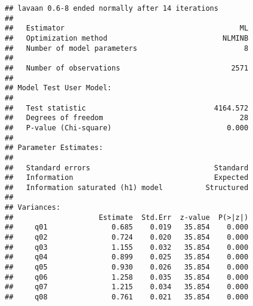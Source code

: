 \documentclass[
]{article}
\newenvironment{Shaded}{\begin{snugshade}}{\end{snugshade}}
\newcommand{\AttributeTok}[1]{\textcolor[rgb]{0.77,0.63,0.00}{#1}}
\newcommand{\CommentTok}[1]{\textcolor[rgb]{0.56,0.35,0.01}{\textit{#1}}}
\newcommand{\FunctionTok}[1]{\textcolor[rgb]{0.00,0.00,0.00}{#1}}
\newcommand{\NormalTok}[1]{#1}
\newcommand{\OtherTok}[1]{\textcolor[rgb]{0.56,0.35,0.01}{#1}}
\newcommand{\SpecialCharTok}[1]{\textcolor[rgb]{0.00,0.00,0.00}{#1}}
\newcommand{\StringTok}[1]{\textcolor[rgb]{0.31,0.60,0.02}{#1}}
\begin{document}
\begin{Shaded}
\end{Shaded}

\begin{verbatim}
## lavaan 0.6-8 ended normally after 14 iterations
## 
##   Estimator                                         ML
##   Optimization method                           NLMINB
##   Number of model parameters                         8
##                                                       
##   Number of observations                          2571
##                                                       
## Model Test User Model:
##                                                       
##   Test statistic                              4164.572
##   Degrees of freedom                                28
##   P-value (Chi-square)                           0.000
## 
## Parameter Estimates:
## 
##   Standard errors                             Standard
##   Information                                 Expected
##   Information saturated (h1) model          Structured
## 
## Variances:
##                    Estimate  Std.Err  z-value  P(>|z|)
##     q01               0.685    0.019   35.854    0.000
##     q02               0.724    0.020   35.854    0.000
##     q03               1.155    0.032   35.854    0.000
##     q04               0.899    0.025   35.854    0.000
##     q05               0.930    0.026   35.854    0.000
##     q06               1.258    0.035   35.854    0.000
##     q07               1.215    0.034   35.854    0.000
##     q08               0.761    0.021   35.854    0.000
\end{verbatim}
\end{document}

